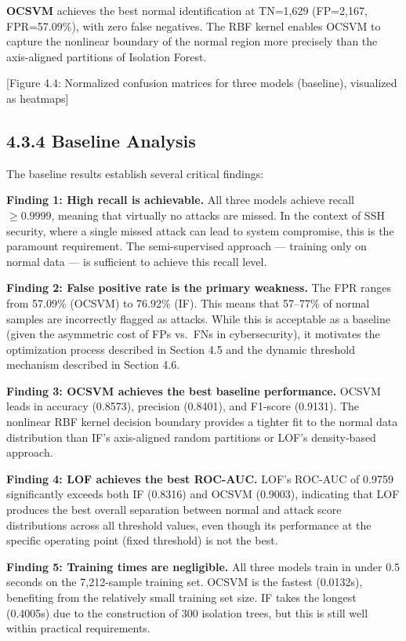 \documentclass[
  a4paper]{report}
\begin{document}
\textbf{OCSVM} achieves the best normal identification at TN=1,629
(FP=2,167, FPR=57.09\%), with zero false negatives. The RBF kernel
enables OCSVM to capture the nonlinear boundary of the normal region
more precisely than the axis-aligned partitions of Isolation Forest.

{[}Figure 4.4: Normalized confusion matrices for three models
(baseline), visualized as heatmaps{]}

\subsection{4.3.4 Baseline Analysis}\label{baseline-analysis}

The baseline results establish several critical findings:

\textbf{Finding 1: High recall is achievable.} All three models achieve
recall \(\geq 0.9999\), meaning that virtually no attacks are missed. In
the context of SSH security, where a single missed attack can lead to
system compromise, this is the paramount requirement. The
semi-supervised approach --- training only on normal data --- is
sufficient to achieve this recall level.

\textbf{Finding 2: False positive rate is the primary weakness.} The FPR
ranges from 57.09\% (OCSVM) to 76.92\% (IF). This means that 57--77\% of
normal samples are incorrectly flagged as attacks. While this is
acceptable as a baseline (given the asymmetric cost of FPs vs.~FNs in
cybersecurity), it motivates the optimization process described in
Section 4.5 and the dynamic threshold mechanism described in Section
4.6.

\textbf{Finding 3: OCSVM achieves the best baseline performance.} OCSVM
leads in accuracy (0.8573), precision (0.8401), and F1-score (0.9131).
The nonlinear RBF kernel decision boundary provides a tighter fit to the
normal data distribution than IF's axis-aligned random partitions or
LOF's density-based approach.

\textbf{Finding 4: LOF achieves the best ROC-AUC.} LOF's ROC-AUC of
0.9759 significantly exceeds both IF (0.8316) and OCSVM (0.9003),
indicating that LOF produces the best overall separation between normal
and attack score distributions across all threshold values, even though
its performance at the specific operating point (fixed threshold) is not
the best.

\textbf{Finding 5: Training times are negligible.} All three models
train in under 0.5 seconds on the 7,212-sample training set. OCSVM is
the fastest (0.0132s), benefiting from the relatively small training set
size. IF takes the longest (0.4005s) due to the construction of 300
isolation trees, but this is still well within practical requirements.
\end{document}
